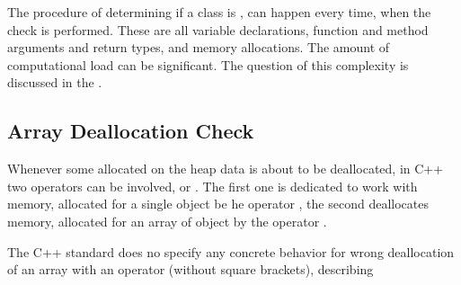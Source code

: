 The procedure of determining if a class is , can happen every time, when the check is performed. These are all 
variable declarations, function and method arguments and return types, and memory allocations. The amount of computational
load can be significant. The question of this complexity is discussed in the .


\subsection{Array Deallocation Check}
Whenever some allocated on the heap data is about to be deallocated, in C++ two operators can
be involved,  or . The first one is dedicated to work with memory, allocated
for a single object be he operator , the second deallocates memory, allocated for an array
of object by the operator .

The C++ standard does no specify any concrete behavior for wrong deallocation of an array with 
an operator  (without square brackets), describing



